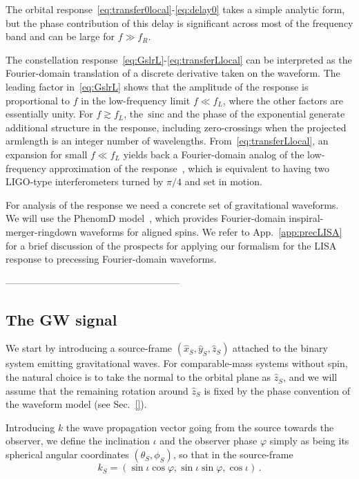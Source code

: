 \documentclass[aps,showpacs,twocolumn,prd,superscriptaddress,nofootinbib]{revtex4-1}
\newcommand{\be}{\begin{equation}}
\newcommand{\ee}{\end{equation}}
\newcommand{\sinc}{\,\mathrm{sinc}}
\newcommand{\SM}[1]{{\color{Blue} #1}}
\begin{document}
The orbital response~\eqref{eq:transfer0local}-\eqref{eq:delay0} takes a simple analytic form, but the phase contribution of this delay is significant across most of the frequency band and can be large for $f \gg f_{R}$.

The constellation response~\eqref{eq:GslrL}-\eqref{eq:transferLlocal} can be interpreted as the Fourier-domain translation of a discrete derivative taken on the waveform. The leading factor in~\eqref{eq:GslrL} shows that the amplitude of the response is proportional to $f$ in the low-frequency limit $f\ll f_{L}$, where the other factors are essentially unity. For $f\gtrsim f_{L}$, the $\sinc$ and the phase of the exponential generate additional structure in the response, including zero-crossings when the projected armlength is an integer number of wavelengths. From~\eqref{eq:transferLlocal}, an expansion for small $f\ll f_{L}$ yields back a Fourier-domain analog of the low-frequency approximation of the response~\cite{Cutler97, RCP04}, which is equivalent to having two LIGO-type interferometers turned by $\pi/4$ and set in motion.

For analysis of the response we need a concrete set of gravitational waveforms. We will use the PhenomD model~\cite{Khan+15,Husa+15}, which provides Fourier-domain inspiral-merger-ringdown waveforms for aligned spins. We refer to App.~\ref{app:precLISA} for a brief discussion of the prospects for applying our formalism for the LISA response to precessing Fourier-domain waveforms.

\SM{------------------------------------------------------}


\subsection{The GW signal}
\label{sec:gwsignal}

We start by introducing a source-frame $(\hat{x}_{S}, \hat{y}_{S}, \hat{z}_{S})$ attached to the binary system emitting gravitational waves. For comparable-mass systems without spin, the natural choice is to take the normal to the orbital plane as $\hat{z}_{S}$, and we will assume that the remaining rotation around $\hat{z}_{S}$ is fixed by the phase convention of the waveform model (see Sec.~\ref{}).

Introducing $k$ the wave propagation vector going from the source towards the observer, we define the inclination $\iota$ and the observer phase $\varphi$ simply as being its spherical angular coordinates $(\theta_{S}, \phi_{S})$, so that in the source-frame
\be
	k_{S} = (\sin\iota \cos\varphi, \sin\iota \sin\varphi, \cos\iota) \,.
\ee
\end{document}
